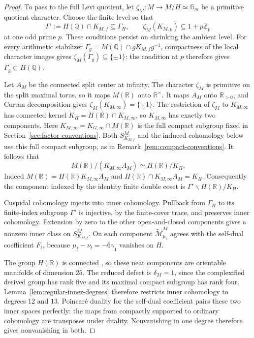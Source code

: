 \documentclass[12pt]{amsart}
\numberwithin{equation}{section}
\theoremstyle{plain}
\theoremstyle{definition}
\theoremstyle{remark}
\newcommand{\R}{\mathbb R}
\newcommand{\tcM}{\widetilde{\mathcal M}}
\begin{document}
\begin{proof}
To pass to the full Levi quotient, let $\zeta_M:M\longrightarrow M/H\simeq\mathbb G_m$ be a primitive quotient character. Choose the finite level so that
\[
 \Gamma':=H(\mathbb Q)\cap K_{M,f}\subseteq\Gamma_H,
 \qquad
 \zeta_M(K_{M,p})\subseteq1+p\mathbb Z_p
\]
at one odd prime $p$. These conditions persist on shrinking the ambient level. For every arithmetic stabilizer $\Gamma_g=M(\mathbb Q)\cap gK_{M,f}g^{-1}$, compactness of the local character images gives $\zeta_M(\Gamma_g)\subseteq\{\pm1\}$; the condition at $p$ therefore gives $\Gamma_g\subset H(\mathbb Q)$.

Let $A_M$ be the connected split center at infinity. The character $\zeta_M$ is primitive on the split maximal torus, so it maps $M(\mathbb R)$ onto $\mathbb R^\times$. It maps $A_M$ onto $\mathbb R_{>0}$, and Cartan decomposition gives $\zeta_M(K_{M,\infty})=\{\pm1\}$. The restriction of $\zeta_M$ to $K_{M,\infty}$ has connected kernel
$K_H=H(\R)\cap K_{M,\infty}$, so $K_{M,\infty}$ has exactly two
components. Here $K_{M,\infty}=K_{G,\infty}\cap M(\R)$ is the full
compact subgroup fixed in Section~\ref{sec:factor-conventions}.
Both $S^M_{K_{M,f}}$ and the induced cohomology below use this full
compact subgroup, as in Remark~\ref{rem:compact-conventions}. It follows that
\[
 M(\mathbb R)/(K_{M,\infty}A_M)
       \simeq H(\mathbb R)/K_H.
\]
Indeed $M(\mathbb R)=H(\mathbb R)K_{M,\infty}A_M$ and $H(\mathbb R)\cap K_{M,\infty}A_M=K_H$. Consequently the component indexed by the identity finite double coset is $\Gamma'\backslash H(\mathbb R)/K_H$.

Cuspidal cohomology injects into inner cohomology. Pullback from $\Gamma_H$ to its finite-index subgroup $\Gamma'$ is injective, by the finite-cover trace, and preserves inner cohomology. Extension by zero to the other open-and-closed components gives a nonzero inner class on $S^M_{K_{M,f}}$. On each component $\tcM_{\mu_t}^M$ agrees with the self-dual coefficient $F_t$, because $\mu_t-\nu_t=-6\gamma_1$ vanishes on $H$.

The group $H(\mathbb R)$ is connected \cite[Cor.~4.7]{BorelTits1972}, so these neat components are orientable manifolds of dimension $25$. The reduced defect is $\delta_M=1$, since the complexified derived group has rank five and its maximal compact subgroup has rank four. Lemma~\ref{lem:regular-inner-degrees} therefore restricts inner cohomology to degrees $12$ and $13$. Poincar\'e duality for the self-dual coefficient pairs these two inner spaces perfectly: the maps from compactly supported to ordinary cohomology are transposes under duality. Nonvanishing in one degree therefore gives nonvanishing in both.
\end{proof}
\end{document}
